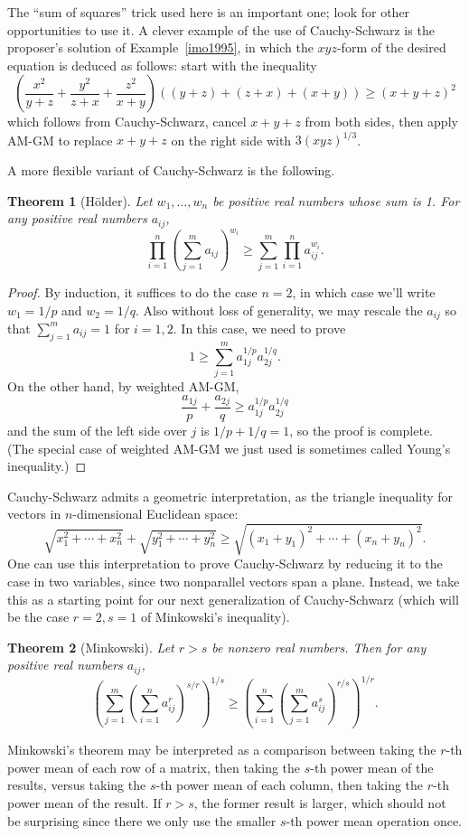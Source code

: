 \documentclass[12pt]{report}
\newtheorem{theorem}{Theorem}
\numberwithin{exc}{section}
\begin{document}
The ``sum of squares'' trick used here is an important one; look for other
opportunities to use it.
A clever example of the use of Cauchy-Schwarz is the proposer's solution
of Example~\ref{imo1995}, in which the $xyz$-form of the desired
equation is deduced as follows: start with the inequality
\[
\left( \frac{x^2}{y+z} + \frac{y^2}{z+x} + \frac{z^2}{x+y} \right)
((y+z)+(z+x)+(x+y)) \geq (x+y+z)^2
\]
which follows from Cauchy-Schwarz, cancel $x+y+z$ from both sides, then
apply AM-GM to replace $x+y+z$ on the right side with $3(xyz)^{1/3}$.

A more flexible variant of Cauchy-Schwarz is the following.
\begin{theorem}[H\"older]
Let $w_{1}, \dots, w_{n}$ be positive real numbers whose sum is 1. For 
any positive real numbers $a_{ij}$,
\[
\prod_{i=1}^{n} \left( \sum_{j=1}^{m} a_{ij} \right)^{w_{i}}
\geq \sum_{j=1}^{m} \prod_{i=1}^{n} a_{ij}^{w_{i}}.
\]
\end{theorem}
\begin{proof}
By induction, it suffices to do the case $n=2$, in 
which case we'll write $w_{1} = 1/p$ and $w_{2} = 1/q$. Also without 
loss of generality, we may rescale the $a_{ij}$ so that $\sum_{j=1}^{m} 
a_{ij} = 1$ for $i=1,2$. In this case, we need to prove
\[
1 \geq \sum_{j=1}^{m} a_{1j}^{1/p} a_{2j}^{1/q}.
\]
On the other hand, by weighted AM-GM,
\[
\frac{a_{1j}}{p} + \frac{a_{2j}}{q} \geq a_{1j}^{1/p} a_{2j}^{1/q}
\]
and the sum of the left side over $j$ is $1/p + 1/q = 1$, so the 
proof is complete. (The special case of weighted AM-GM we just used is
sometimes called Young's inequality.)
\end{proof}

Cauchy-Schwarz admits a geometric interpretation, as
the triangle inequality for 
vectors in $n$-dimensional Euclidean space:
\[
\sqrt{x_{1}^{2} + \cdots + x_{n}^{2}} + \sqrt{y_{1}^{2} + \cdots + 
y_{n}^{2}} \geq \sqrt{(x_{1}+y_{1})^{2} + \cdots + (x_{n}+y_{n})^{2}}.
\]
One can use this 
interpretation to prove Cauchy-Schwarz by reducing it to the case in 
two variables, since two nonparallel vectors span a plane. Instead, we 
take this as a starting point for our next generalization of 
Cauchy-Schwarz (which will be the case  $r=2, s=1$ of Minkowski's 
inequality).
\begin{theorem}[Minkowski] \label{minkowski}
Let $r > s$ be nonzero real numbers. Then for
any positive real numbers $a_{ij}$,
\[
\left( \sum_{j=1}^{m} \left( \sum_{i=1}^{n} a_{ij}^{r} \right)^{s/r} 
\right)^{1/s}
\geq
\left( \sum_{i=1}^{n} \left( \sum_{j=1}^{m} a_{ij}^{s} \right)^{r/s} 
\right)^{1/r}.
\]
\end{theorem}
Minkowski's theorem may be interpreted as a comparison between taking 
the $r$-th power mean of each row of a matrix, then taking the $s$-th 
power mean of the results, versus taking the $s$-th power mean of 
each column, then taking the $r$-th power mean of the result. If 
$r>s$, the former result is larger, which should not be surprising 
since there we only use the smaller $s$-th power mean operation once.
\end{document}
